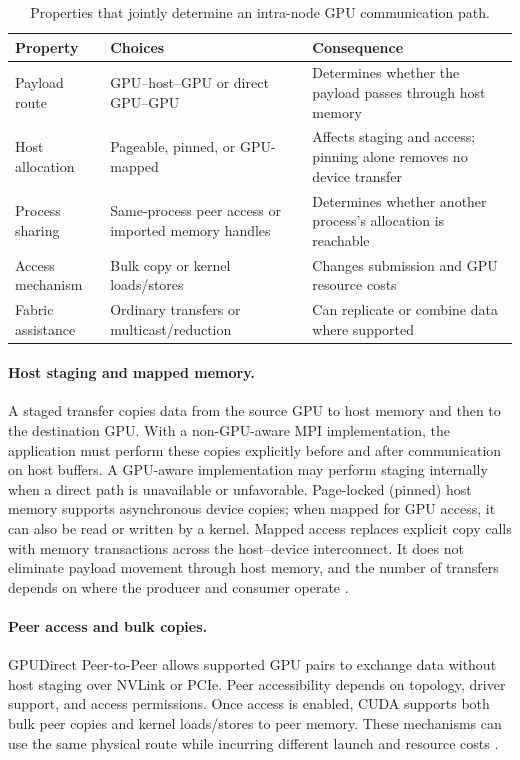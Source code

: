 \begin{table}[htbp]
\centering
\caption[Properties of an intra-node GPU communication path]{Properties that jointly determine an intra-node GPU communication path.}
\label{tab:m-intra-types}
\footnotesize
\begin{tabularx}{\textwidth}{lYY}
\toprule
Property & Choices & Consequence\\
\midrule
Payload route & GPU--host--GPU or direct GPU--GPU & Determines whether the payload passes through host memory\\
Host allocation & Pageable, pinned, or GPU-mapped & Affects staging and access; pinning alone removes no device transfer\\
Process sharing & Same-process peer access or imported memory handles & Determines whether another process's allocation is reachable\\
Access mechanism & Bulk copy or kernel loads/stores & Changes submission and GPU resource costs\\
Fabric assistance & Ordinary transfers or multicast/reduction & Can replicate or combine data where supported\\
\bottomrule
\end{tabularx}
\end{table}

\paragraph{Host staging and mapped memory.} A staged transfer copies data from the source GPU to host memory and then to the destination GPU. With a non-GPU-aware MPI implementation, the application must perform these copies explicitly before and after communication on host buffers. A GPU-aware implementation may perform staging internally when a direct path is unavailable or unfavorable. Page-locked (pinned) host memory supports asynchronous device copies; when mapped for GPU access, it can also be read or written by a kernel. Mapped access replaces explicit copy calls with memory transactions across the host--device interconnect. It does not eliminate payload movement through host memory, and the number of transfers depends on where the producer and consumer operate \cite{nvidia_cuda_programming_2026}.

\paragraph{Peer access and bulk copies.} GPUDirect Peer-to-Peer allows supported GPU pairs to exchange data without host staging over NVLink or PCIe. Peer accessibility depends on topology, driver support, and access permissions. Once access is enabled, CUDA supports both bulk peer copies and kernel loads/stores to peer memory. These mechanisms can use the same physical route while incurring different launch and resource costs \cite{nvidia_cuda_programming_2026}.

